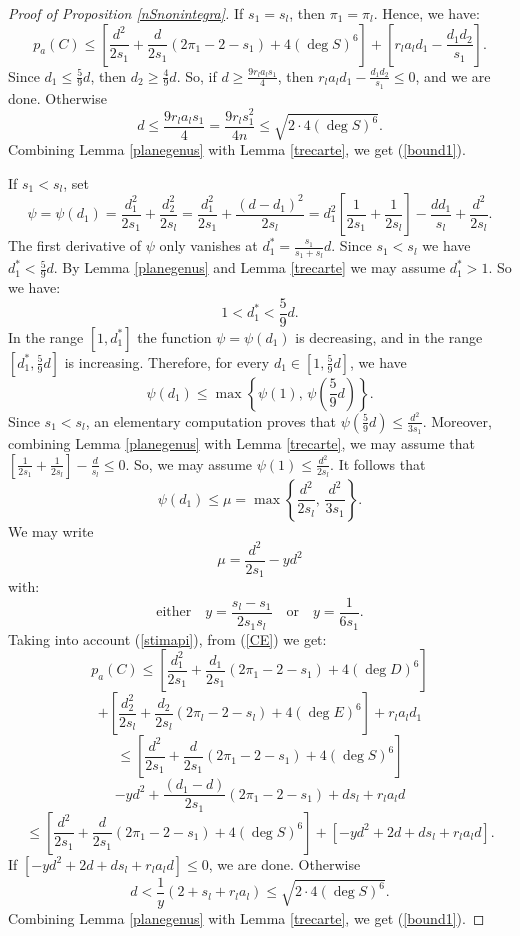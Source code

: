 \documentclass[9pt,a4paper]{amsart}
\theoremstyle{plain}
\theoremstyle{definition}
\theoremstyle{remark}
\begin{document}
\begin{proof}[Proof of Proposition \ref{nSnonintegra}]
\smallskip
If $s_1=s_l$, then $\pi_1=\pi_l$. Hence, we have:
\begin{equation}\label{ce1}
p_a(C)\leq
\left[\frac{d^2}{2s_1}+\frac{d}{2s_1}(2\pi_1-2-s_1)+4(\deg
S)^6\right] +\left[r_la_ld_1-\frac{d_1d_2}{s_1}\right].
\end{equation}
Since $d_1\leq \frac{5}{9}d$, then $d_2\geq \frac{4}{9}d$. So,
if $d\geq \frac{9r_la_ls_1}{4}$, then
$r_la_ld_1-\frac{d_1d_2}{s_1}\leq 0$, and we are done. Otherwise
$$d\leq \frac{9r_la_ls_1}{4}=\frac{9r_ls_1^2}{4n}\leq \sqrt{2\cdot 4(\deg S)^6}.$$
Combining Lemma \ref{planegenus} with Lemma \ref{trecarte}, we get
(\ref{bound1}).

\smallskip
If $s_1<s_l$, set
$$
\psi=\psi(d_1)=\frac{d_1^2}{2s_1}+\frac{d_2^2}{2s_l}=\frac{d_1^2}{2s_1}+\frac{(d-d_1)^2}{2s_l}=
d_1^2\left[\frac{1}{2s_1}+\frac{1}{2s_l}\right]-\frac{dd_1}{s_l}+\frac{d^2}{2s_l}.
$$
The first derivative of $\psi$ only vanishes at
$d_1^*=\frac{s_1}{s_1+s_l}d$. Since $s_1<s_l$ we have
$d_1^*<\frac{5}{9}d$. By Lemma \ref{planegenus} and Lemma
\ref{trecarte} we may assume $d_1^*>1$. So we have:
$$
1<d_1^*<\frac{5}{9}d.
$$
In the range $\left[1,d_1^*\right]$ the function $\psi=\psi(d_1)$ is
decreasing, and in the range $\left[d_1^*,\frac{5}{9}d\right]$ is
increasing. Therefore, for every $d_1\in
\left[1,\frac{5}{9}d\right]$, we have
$$
\psi(d_1)\leq \max\left\{\psi(1),\,
\psi\left(\frac{5}{9}d\right)\right\}.
$$
Since $s_1<s_l$, an elementary computation proves that
$\psi\left(\frac{5}{9}d\right)\leq \frac{d^2}{3s_1}$.
Moreover, combining Lemma \ref{planegenus} with Lemma \ref{trecarte}, we
may assume that $ \left[\frac{1}{2s_1}+\frac{1}{2s_l}\right]-\frac{d}{s_l}\leq 0$.
So, we may assume $\psi(1)\leq \frac{d^2}{2s_l}$.
It follows that
$$
\psi(d_1)\leq \mu=\max\left\{\frac{d^2}{2s_l},\,
\frac{d^2}{3s_1}\right\}.
$$
We may write
$$
\mu=\frac{d^2}{2s_1}-yd^2
$$
with:
$$
{\text{either}}\quad y=\frac{s_l-s_1}{2s_1s_l}\quad{\text{or}}\quad y=\frac{1}{6s_1}.
$$
Taking into account (\ref{stimapi}), from (\ref{CE}) we get:
\begin{equation}\label{ce2}
p_a(C)\leq
\left[\frac{d_1^2}{2s_1}+\frac{d_1}{2s_1}(2\pi_1-2-s_1)+4(\deg
D)^6\right]
\end{equation}
$$
+ \left[\frac{d_2^2}{2s_l} +\frac{d_2}{2s_l}(2\pi_l-2-s_l)+4(\deg
E)^6\right]+r_la_ld_1
$$
$$
\leq \left[\frac{d^2}{2s_1}+\frac{d}{2s_1}(2\pi_1-2-s_1)+4(\deg
S)^6\right]
$$
$$
-yd^2+\frac{(d_1-d)}{2s_1}(2\pi_1-2-s_1) +ds_l+r_la_ld
$$
$$
\leq \left[\frac{d^2}{2s_1}+\frac{d}{2s_1}(2\pi_1-2-s_1)+4(\deg
S)^6\right] +\left[-yd^2+2d +ds_l+r_la_ld\right].
$$
If $\left[-yd^2+2d +ds_l+r_la_ld\right]\leq 0$,  we are done.
Otherwise
$$d<\frac{1}{y}(2+s_l+r_la_l)\leq \sqrt{2\cdot 4(\deg S)^6}.$$
Combining Lemma \ref{planegenus} with Lemma \ref{trecarte}, we get
(\ref{bound1}).


\end{proof}
\end{document}
